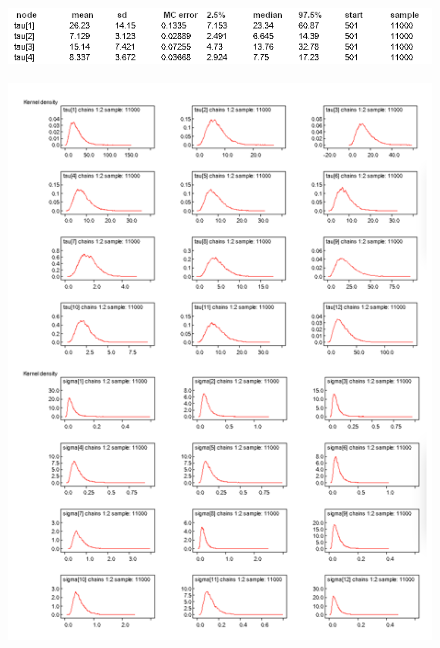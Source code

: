 \documentclass{article}
\begin{document}
\begin{figure}[ht!]
\centering
\includegraphics[width=12cm]{figures/model3_ultima2.png}
\end{figure}


\begin{figure}[ht!]
\centering
\includegraphics[width=12cm]{figures/model3_sigma.png}
\end{figure}
\end{document}
